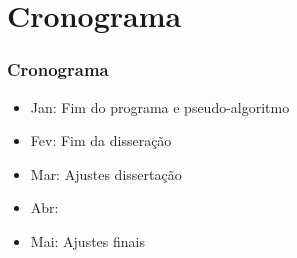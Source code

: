 \documentclass[10pt]{beamer}
\theoremstyle{remark}
\theoremstyle{definition}
\begin{document}
\section{Cronograma}
\begin{frame}[allowframebreaks]
\frametitle{Cronograma}

\begin{itemize}
	\item Jan: Fim do programa e pseudo-algoritmo
	\item Fev: Fim da disseração
	\item Mar: Ajustes dissertação
	\item Abr:
	\item Mai: Ajustes finais
\end{itemize}

\end{frame}
\end{document}
